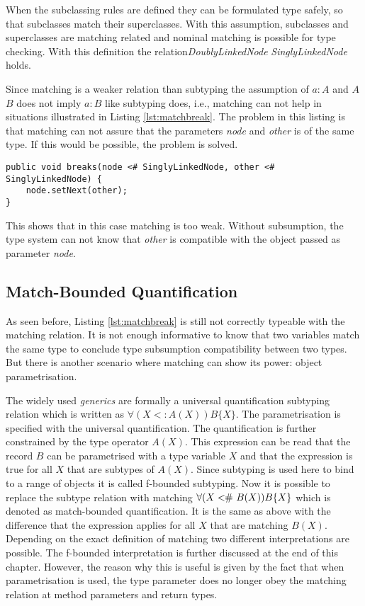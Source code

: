 When the subclassing rules are defined they can be formulated type
safely, so that subclasses match their superclasses. With this
assumption, subclasses and superclasses are matching related and
nominal matching is possible for type checking. With this definition
the relation\emph{DoublyLinkedNode} \match \emph{SinglyLinkedNode} holds.

Since matching is a weaker relation than subtyping the assumption of
$a:A$ and $A$ \match $B$ does not imply $a:B$ like subtyping does,
i.e., matching can not help in situations illustrated in Listing
\ref{lst:matchbreak}. The problem in this listing is that matching can
not assure that the parameters \emph{node} and \emph{other} is of the
same type. If this would be possible, the problem is solved.

\begin{lstlisting}[float=ht,label={lst:matchbreak},caption={Matching relation in the break method.}]
public void breaks(node <# SinglyLinkedNode, other <# SinglyLinkedNode) {
	node.setNext(other);
}
\end{lstlisting}

This shows that in this case matching is too weak. Without subsumption,
the type system can not know that \emph{other} is compatible with the
object passed as parameter \emph{node}.

\subsection{Match-Bounded Quantification}
As seen before, Listing \ref{lst:matchbreak} is still not correctly
typeable with the matching relation. It is not enough informative to
know that two variables match the same type to conclude type
subsumption compatibility between two types. But there is another
scenario where matching can show its power: object parametrisation.

The widely used \emph{generics} are formally a universal quantification
subtyping relation which is written as $\forall (X <: A(X))B\{X\}$. The
parametrisation is specified with the universal quantification. The
quantification is further constrained by the type operator $A(X)$. This
expression can be read that the record $B$ can be parametrised with a
type variable $X$ and that the expression is true for all $X$ that are
subtypes of $A(X)$.  Since subtyping is used here to bind \X to a range of
objects it is called f-bounded subtyping. Now it is possible to replace
the subtype relation with matching $\forall(X <\!\!\#~ B(X))B\{X\}$
which is denoted as match-bounded quantification. It is the same as
above with the difference that the expression applies for all $X$ that
are matching $B(X)$. Depending on the exact definition of matching two
different interpretations are possible\cite{abadi_subtyping_1996}. The
f-bounded interpretation is further discussed at the end of this
chapter. However, the reason why this is useful is given by the fact
that when parametrisation is used, the type parameter does no longer
obey the matching relation at method parameters and return types.

